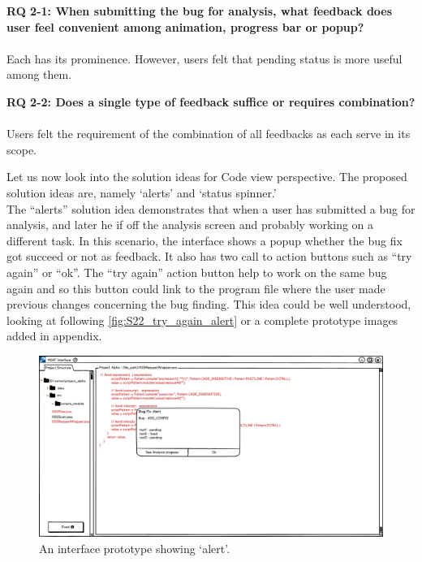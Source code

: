 \begin{myboxi}{{\textbf{RQ 2-1: When submitting the bug for analysis, what feedback does user feel convenient among animation, progress bar or popup?}}}
\\ \\	Each has its prominence. However, users felt that pending status is more useful among them.
\end{myboxi}

\begin{myboxi}{{\textbf{RQ 2-2: Does a single type of feedback suffice or requires combination?}}}
\\ \\	Users felt the requirement of the combination of all feedbacks as each serve in its scope.
\end{myboxi}

Let us now look into the solution ideas for Code view perspective. The proposed solution ideas are, namely ‘alerts’ and ‘status spinner.’ \\


The “alerts” solution idea demonstrates that when a user has submitted a bug for analysis, and later he if off the analysis screen and probably working on a different task. In this scenario,  the interface shows a popup whether the bug fix got succeed or not as feedback. It also has two call to action buttons such as “try again” or “ok”. The “try again” action button help to work on the same bug again and so this button could link to the program file where the user made previous changes concerning the bug finding. This idea could be well understood, looking at following \autoref{fig:S22_try_again_alert} or a complete prototype images added in appendix. \\


\begin{figure}[hbt!]
	\centering
	\includegraphics[width=\linewidth]{figures/solution_ideas_snaps/S22_try_again_alert}
	\caption{An interface prototype showing ‘alert’.}
	\label{fig:S22_try_again_alert}
\end{figure}

